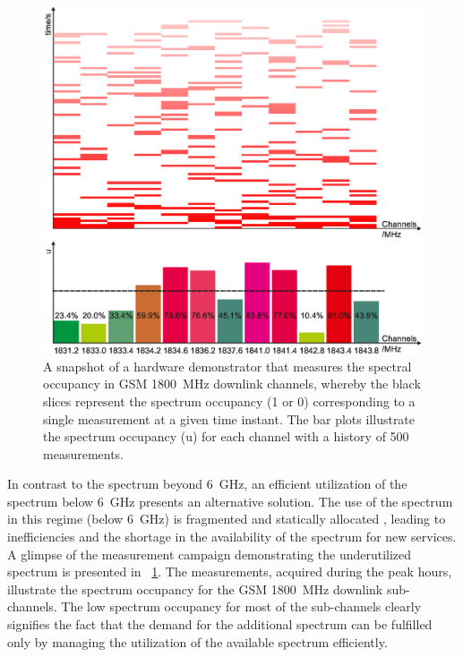 \begin{figure}[!t]
\centering
\includegraphics[width = 0.9\columnwidth]{figures/Grafik_Poster}
\caption{A snapshot of a hardware demonstrator that measures the spectral occupancy in GSM \SI{1800}{MHz} downlink channels, whereby the black slices represent the spectrum occupancy (1 or 0) corresponding to a single measurement at a given time instant. The bar plots illustrate the spectrum occupancy (u) for each channel with a history of 500 measurements\protect{}.}
\label{fig_Int:HW_I}
\end{figure}


In contrast to the spectrum beyond \SI{6}{GHz}, an efficient utilization of the spectrum below \SI{6}{GHz} presents an alternative solution. The use of the spectrum in this regime (below \SI{6}{GHz}) is fragmented and statically allocated \cite{Mchen05, Mchen07}, leading to inefficiencies and the shortage in the availability of the spectrum for new services. A glimpse of the measurement campaign demonstrating the underutilized spectrum is presented in \figurename~\ref{fig_Int:HW_I}. The measurements, acquired during the peak hours, illustrate the spectrum occupancy for the GSM \SI{1800}{MHz} downlink sub-channels. The low spectrum occupancy for most of the sub-channels clearly signifies the fact that the demand for the additional spectrum can be fulfilled only by managing the utilization of the available spectrum efficiently. 

